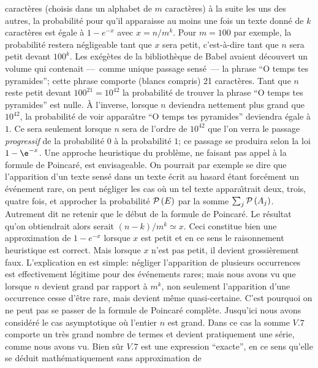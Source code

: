 caract\`eres (choisis dans un alphabet de $m$ caract\`eres) \`a la suite
les uns des autres, la probabilit\'e pour qu'il apparaisse au moins une 
fois un texte donn\'e de $k$ caract\`eres est \'egale \`a $1 - e^{-x}$ 
avec $x=n/m^k$. Pour $m=100$ par exemple, la probabilit\'e restera
n\'egligeable tant que $x$  sera petit, c'est-\`a-dire tant que $n$ sera
petit devant $100^k$. Les ex\'eg\`etes de la biblioth\`eque de Babel
avaient d\'ecouvert un volume qui contenait ---~comme unique passage
sens\'e~--- la phrase ``O temps tes pyramides''; cette phrase comporte
(blancs compris) 21 caract\`eres. Tant que $n$ reste petit devant
$100^{21} = 10^{42}$ la probabilit\'e de  trouver la phrase ``O temps tes
pyramides'' est nulle. \`A l'inverse, lorsque $n$ deviendra nettement plus
grand que $10^{42}$, la probabilit\'e de  voir appara{\^\i}tre ``O temps tes
pyramides'' deviendra \'egale \`a $1$. Ce sera seulement lorsque $n$ sera 
de l'ordre de $10^{42}$ que l'on verra le passage {\it progressif} de la 
probabilit\'e $0$ \`a la probabilit\'e $1$; ce passage se produira selon la
loi $1-\e^{-x}$.
\medskip
Une approche heuristique du probl\`eme,  ne faisant pas appel \`a la 
formule de Poincar\'e,  est envisageable.  On pourrait par exemple se dire
que l'apparition d'un texte sens\'e dans un texte \'ecrit au hasard \'etant
forc\'ement un \'ev\'enement rare,  on peut n\'egliger les cas o\`u un tel
texte appara{\^\i}trait deux,  trois,  quatre fois,  et approcher la
probabilit\'e ${\cal P}\, (E)$ par la somme $\sum_j {\cal P}\, (A_j)$.
Autrement dit ne retenir que le d\'ebut de la formule de Poincar\'e.  Le
r\'esultat qu'on obtiendrait alors serait $(n-k)/m^k \simeq x$.  Ceci
constitue bien une approximation de $1-e^{-x}$ lorsque $x$ est petit et
en ce sens le raisonnement heuristique est correct.  Mais lorsque $x$ n'est
pas petit,  il devient grossi\`erement faux.  L'explication en est simple:
n\'egliger l'apparition  de plusieurs occurrences est effectivement
l\'egitime pour des \'ev\'enements rares;  mais nous avons vu que lorsque
$n$ devient grand par rapport \`a $m^k$,  non seulement l'apparition d'une
occurrence cesse d'\^etre rare,  mais devient m\^eme quasi-certaine.  C'est
pourquoi on ne peut pas se passer de la formule de Poincar\'e compl\`ete.
\medskip
Jusqu'ici nous avons consid\'er\'e le cas asymptotique o\`u l'entier $n$
est grand. Dans ce cas la somme $V.7$ comporte un tr\`es grand nombre 
de termes et devient pratiquement une s\'erie, comme nous avons vu. 
\medskip
Bien s\^ur  $V.7$ est une expression ``exacte'', en ce sens qu'elle 
se d\'eduit math\'e\-ma\-ti\-que\-ment sans approximation de
